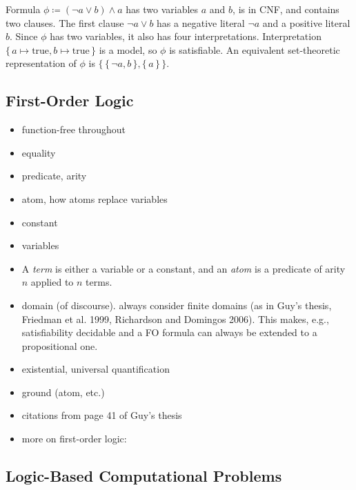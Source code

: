 \begin{example}
  Formula $\phi \coloneqq (\neg a \lor b) \land a$ has two variables $a$ and $b$, is in CNF, and contains two clauses. The first clause $\neg a \lor b$ has a negative literal $\neg a$ and a positive literal $b$. Since $\phi$ has two variables, it also has four interpretations. Interpretation $\{\, a \mapsto \text{true}, b \mapsto \text{true} \,\}$ is a model, so $\phi$ is satisfiable. An equivalent set-theoretic representation of $\phi$ is $\{\, \{\, \neg a, b \,\}, \{\, a \,\} \,\}$.
\end{example}

\subsection{First-Order Logic} \label{sec:fologic}

\begin{itemize}
\item function-free throughout
\item equality
\item predicate, arity
\item atom, how atoms replace variables
\item constant
\item variables
\item A \emph{term} is either a variable or a constant, and an \emph{atom} is a predicate of arity $n$ applied to $n$ terms.
\item domain (of discourse). always consider finite domains (as in Guy's thesis, Friedman et al. 1999, Richardson and Domingos 2006). This makes, e.g., satisfiability decidable and a FO formula can always be extended to a propositional one.
\item existential, universal quantification
\item ground (atom, etc.)
\item citations from page 41 of Guy's thesis
\item more on first-order logic: \citep{DBLP:books/daglib/0023546}
\end{itemize}

\subsection{Logic-Based Computational Problems} \label{sec:logicproblems}

